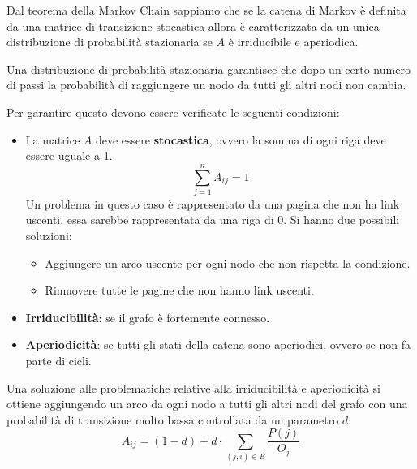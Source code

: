 Dal teorema della Markov Chain sappiamo che se la catena di Markov è definita da
una matrice di transizione stocastica allora è caratterizzata da un unica
distribuzione di probabilità stazionaria se $A$ è irriducibile e aperiodica.
\begin{nota}
    Una distribuzione di probabilità stazionaria garantisce che dopo un certo
    numero di passi la probabilità di raggiungere un nodo da tutti gli altri
    nodi non cambia.
\end{nota}
Per garantire questo devono essere verificate le seguenti condizioni:
\begin{itemize}
    \item La matrice $A$ deve essere \textbf{stocastica}, ovvero la somma di
          ogni riga deve essere uguale a 1.
          \begin{equation*}
              \sum_{j = 1}^n A_{ij} = 1
          \end{equation*}
          Un problema in questo caso è rappresentato da una pagina che non ha
          link uscenti, essa sarebbe rappresentata da una riga di $0$. Si hanno
          due possibili soluzioni:
          \begin{itemize}
              \item Aggiungere un arco uscente per ogni nodo che non rispetta la
                    condizione.
              \item Rimuovere tutte le pagine che non hanno link uscenti.
          \end{itemize}
    \item \textbf{Irriducibilità}: se il grafo è fortemente connesso.
    \item \textbf{Aperiodicità}: se tutti gli stati della catena sono aperiodici,
          ovvero se non fa parte di cicli.
\end{itemize}
Una soluzione alle problematiche relative alla irriducibilità e aperiodicità
si ottiene aggiungendo un arco da ogni nodo a tutti gli altri nodi del grafo con
una probabilità di transizione molto bassa controllata da un parametro $d$:
\begin{equation}
    A_{ij} = (1 - d) + d \cdot \sum_{(j, i) \in E}\frac{P(j)}{O_j}
\end{equation}

